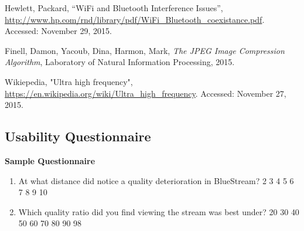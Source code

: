 \documentclass[a4paper,12pt]{article}
\begin{document}
\begin{thebibliography}{9}
Hewlett, Packard, “WiFi and Bluetooth Interference Issues”, \\ \url{http://www.hp.com/rnd/library/pdf/WiFi_Bluetooth_coexistance.pdf}. \\  Accessed: November 29, 2015.

Finell, Damon, Yacoub, Dina, Harmon, Mark, \textit{The JPEG Image Compression Algorithm}, Laboratory of Natural Information Processing, 2015.

Wikiepedia, "Ultra high frequency", \url{https://en.wikipedia.org/wiki/Ultra_high_frequency}. Accessed: November 27, 2015.

\end{thebibliography}

\newpage
\begin{appendices}

\section{Usability Questionnaire}\label{App:Questionnaire}
\centering
\textbf{Sample Questionnaire}

\begin{enumerate}
\item At what distance did notice a quality deterioration in BlueStream?
 \hspace{1.2cm} 2 \hspace{1.2cm} 3 \hspace{1.2cm} 4 \hspace{1.2cm} 5 \hspace{1.2cm} 6 \hspace{1.2cm} 7 \hspace{1.2cm} 8 \hspace{1.2cm} 9 \hspace{1.2cm} 10
\newline

\item Which quality ratio did you find viewing the stream was best under?
 \hspace{1cm} 20 \hspace{1cm} 30 \hspace{1cm} 40 \hspace{1cm} 50 \hspace{1cm} 60 \hspace{1cm} 70 \hspace{1cm} 80 \hspace{1cm} 90 \hspace{1cm} 98
\newline


\end{enumerate}
\end{appendices}
\end{document}
